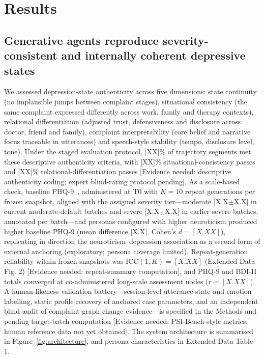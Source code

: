 \documentclass[sn-nature,pdflatex]{sn-jnl}
\begin{document}
\section{Results}\label{sec:results}

\subsection*{Generative agents reproduce severity-consistent and internally coherent depressive states}

We assessed depression-state authenticity across five dimensions: state continuity (no implausible jumps between complaint stages), situational consistency (the same complaint expressed differently across work, family and therapy contexts), relational differentiation (adjusted trust, defensiveness and disclosure across doctor, friend and family), complaint interpretability (core belief and narrative focus traceable in utterances) and speech-style stability (tempo, disclosure level, tone). Under the staged evaluation protocol, [XX]\% of trajectory segments met these descriptive authenticity criteria, with [XX]\% situational-consistency passes and [XX]\% relational-differentiation passes [Evidence needed: descriptive authenticity coding; expert blind-rating protocol pending]. As a scale-based check, baseline PHQ-9~\cite{kroenke2001}, administered at T0 with $K=10$ repeat generations per frozen snapshot, aligned with the assigned severity tier---moderate [X.X$\pm$X.X] in current moderate-default batches and severe [X.X$\pm$X.X] in earlier severe batches, annotated per batch---and personas configured with higher neuroticism produced higher baseline PHQ-9 (mean difference [X.X], Cohen's $d = [X.XX]$), replicating in direction the neuroticism--depression association as a second form of external anchoring (exploratory; persona coverage limited). Repeat-generation reliability within frozen snapshots was $\mathrm{ICC}(1,K) = [X.XX]$ (Extended Data Fig. 2) [Evidence needed: repeat-summary computation], and PHQ-9 and BDI-II~\cite{beck1996} totals converged at co-administered long-scale assessment nodes ($r = [X.XX]$). A human-likeness validation battery---session-level utterance-state and emotion labelling, static profile recovery of anchored case parameters, and an independent blind audit of complaint-graph change evidence---is specified in the Methods and pending target-batch computation [Evidence needed: PSI-Bench-style metrics; human reference data not yet obtained]. The system architecture is summarised in Figure~\ref{fig:architecture}, and persona characteristics in Extended Data Table 1.
\end{document}

